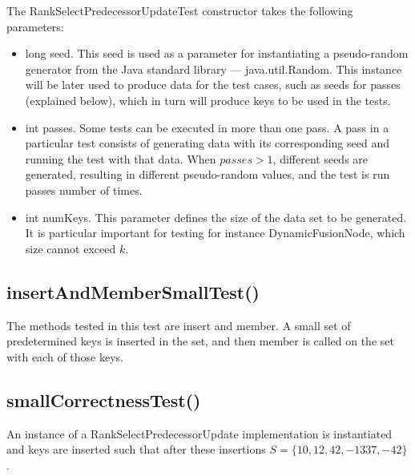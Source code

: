 The {\ttfamily RankSelectPredecessorUpdateTest} constructor takes the following parameters:
\begin{itemize}
    \item {\ttfamily long seed}. This seed is used as a parameter for instantiating a pseudo-random generator from the Java standard library --- {\ttfamily java.util.Random}. This instance will be later used to produce data for the test cases, such as seeds for passes (explained below), which in turn will produce keys to be used in the tests.
    \item {\ttfamily int passes}. Some tests can be executed in more than one pass. A pass in a particular test consists of generating data with its corresponding seed and running the test with that data. When $passes > 1$, different seeds are generated, resulting in different pseudo-random values, and the test is run {\ttfamily passes} number of times.
    \item {\ttfamily int numKeys}. This parameter defines the size of the data set to be generated. It is particular important for testing for instance {\ttfamily DynamicFusionNode}, which size cannot exceed $k$.
\end{itemize}

\subsection{{\ttfamily insertAndMemberSmallTest()}} \label{sec:insertAndMemberSmallTest}
The methods tested in this test are {\ttfamily insert} and {\ttfamily member}. A small set of predetermined keys is inserted in the set, and then {\ttfamily member} is called on the set with each of those keys. 

\subsection{{\ttfamily smallCorrectnessTest()}}

An instance of a {\ttfamily RankSelectPredecessorUpdate} implementation is instantiated and keys are inserted such that after these insertions $S = \{10, 12, 42, -1337, -42\}$.

